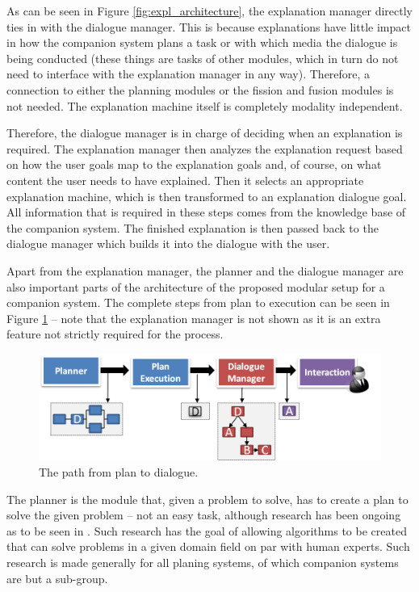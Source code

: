 \documentclass[a4paper]{article}
\begin{document}
As can be seen in Figure \ref{fig:expl_architecture}, the explanation manager directly ties in with the dialogue manager. This is because explanations have little impact in how the companion system plans a task or with which media the dialogue is being conducted (these things are tasks of other modules, which in turn do not need to interface with the explanation manager in any way). Therefore, a connection to either the planning modules or the fission and fusion modules is not needed. The explanation machine itself is completely modality independent.

Therefore, the dialogue manager is in charge of deciding when an explanation is required. The explanation manager then analyzes the explanation request based on how the user goals map to the explanation goals and, of course, on what content the user needs to have explained. Then it selects an appropriate explanation machine, which is then transformed to an explanation dialogue goal. All information that is required in these steps comes from the knowledge base of the companion system. The finished explanation is then passed back to the dialogue manager which builds it into the dialogue with the user.

Apart from the explanation manager, the planner and the dialogue manager are also important parts of the architecture of the proposed modular setup for a companion system. The complete steps from plan to execution can be seen in Figure \ref{fig:planner} – note that the explanation manager is not shown as it is an extra feature not strictly required for the process.

\begin{figure}[H]
	\centering
	\includegraphics[width=12cm]{planner.png}
	\caption{The path from plan to dialogue.}
	\label{fig:planner}
\end{figure}

The planner is the module that, given a problem to solve, has to create a plan to solve the given problem – not an easy task, although research has been ongoing as to be seen in \cite{seegebarth2011formale}. Such research has the goal of allowing algorithms to be created that can solve problems in a given domain field on par with human experts. Such research is made generally for all planing systems, of which companion systems are but a sub-group.
\end{document}
